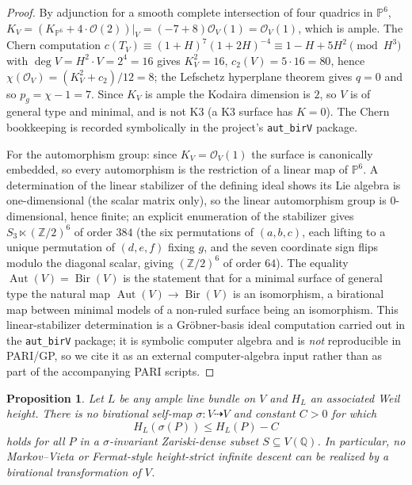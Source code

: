 \documentclass[11pt,reqno]{amsart}
\theoremstyle{plain}
\newtheorem{proposition}[theorem]{Proposition}
\theoremstyle{definition}
\newcommand{\Q}{\mathbb{Q}}
\newcommand{\Z}{\mathbb{Z}}
\newcommand{\PP}{\mathbb{P}}
\newcommand{\Aut}{\operatorname{Aut}}
\newcommand{\Bir}{\operatorname{Bir}}
\begin{document}
\begin{proof}
By adjunction for a smooth complete intersection of four quadrics in $\PP^6$,
$K_V=(K_{\PP^6}+4\cdot\mathcal{O}(2))|_V=(-7+8)\mathcal{O}_V(1)=\mathcal{O}_V(1)$,
which is ample. The Chern computation $c(T_V)\equiv(1+H)^7(1+2H)^{-4}\equiv
1-H+5H^2 \pmod{H^3}$ with $\deg V=H^2\cdot V=2^4=16$ gives $K_V^2=16$,
$c_2(V)=5\cdot16=80$, hence $\chi(\mathcal{O}_V)=(K_V^2+c_2)/12=8$; the Lefschetz
hyperplane theorem gives $q=0$ and so $p_g=\chi-1=7$. Since $K_V$ is ample the
Kodaira dimension is $2$, so $V$ is of general type and minimal, and is not K3
(a K3 surface has $K=0$). The Chern bookkeeping is recorded symbolically in the
project's \texttt{aut\_birV} package.

For the automorphism group: since $K_V=\mathcal{O}_V(1)$ the surface is
canonically embedded, so every automorphism is the restriction of a linear map of
$\PP^6$. A determination of the linear stabilizer of the defining ideal shows its
Lie algebra is one-dimensional (the scalar matrix only), so the linear
automorphism group is $0$-dimensional, hence finite; an explicit enumeration of
the stabilizer gives $S_3\ltimes(\Z/2)^6$ of order $384$ (the six permutations of
$(a,b,c)$, each lifting to a unique permutation of $(d,e,f)$ fixing $g$, and the
seven coordinate sign flips modulo the diagonal scalar, giving $(\Z/2)^6$ of order
$64$). The equality $\Aut(V)=\Bir(V)$ is the statement that for a minimal surface
of general type the natural map $\Aut(V)\to\Bir(V)$ is an isomorphism, a
birational map between minimal models of a non-ruled surface being an
isomorphism. This linear-stabilizer determination is a Gr\"obner-basis ideal
computation carried out in the \texttt{aut\_birV} package; it is symbolic
computer algebra and is \emph{not} reproducible in PARI/GP, so we cite it as an
external computer-algebra input rather than as part of the accompanying PARI
scripts.
\end{proof}

\begin{proposition}\label{prop:descent}
Let $L$ be any ample line bundle on $V$ and $H_L$ an associated Weil height. There
is no birational self-map $\sigma\colon V\dashrightarrow V$ and constant $C>0$ for
which
\[
H_L(\sigma(P))\le H_L(P)-C
\]
holds for all $P$ in a $\sigma$-invariant Zariski-dense subset $S\subseteq V(\Q)$.
In particular, no Markov--Vieta or Fermat-style height-strict infinite descent can
be realized by a birational transformation of $V$.
\end{proposition}
\end{document}
